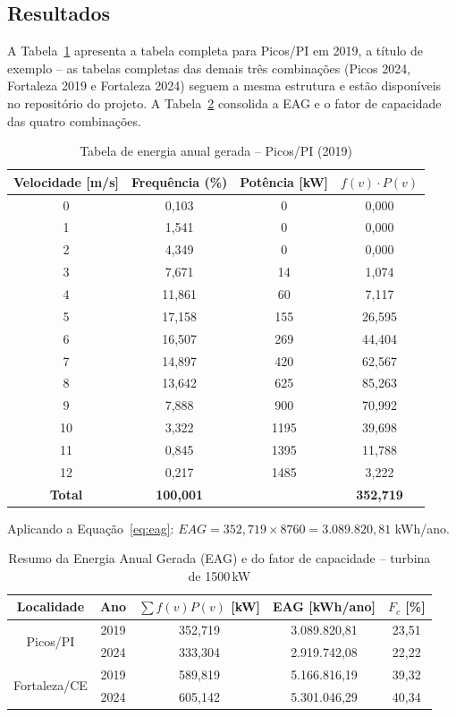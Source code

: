 \documentclass[11pt,a4paper]{article}
\begin{document}
\subsection{Resultados}

A Tabela~\ref{tab:eag_picos_2019} apresenta a tabela completa para
Picos/PI em 2019, a título de exemplo -- as tabelas completas das
demais três combinações (Picos 2024, Fortaleza 2019 e Fortaleza 2024)
seguem a mesma estrutura e estão disponíveis no repositório do projeto.
A Tabela~\ref{tab:resumo_eag} consolida a EAG e o fator de capacidade
das quatro combinações.

\begin{table}[H]
\centering
\caption{Tabela de energia anual gerada -- Picos/PI (2019)}
\label{tab:eag_picos_2019}
\begin{tabular}{cccc}
\toprule
\textbf{Velocidade [m/s]} & \textbf{Frequência (\%)} & \textbf{Potência [kW]} & \textbf{$f(v)\cdot P(v)$} \\
\midrule
0  & 0,103  & 0    & 0,000 \\
1  & 1,541  & 0    & 0,000 \\
2  & 4,349  & 0    & 0,000 \\
3  & 7,671  & 14   & 1,074 \\
4  & 11,861 & 60   & 7,117 \\
5  & 17,158 & 155  & 26,595 \\
6  & 16,507 & 269  & 44,404 \\
7  & 14,897 & 420  & 62,567 \\
8  & 13,642 & 625  & 85,263 \\
9  & 7,888  & 900  & 70,992 \\
10 & 3,322  & 1195 & 39,698 \\
11 & 0,845  & 1395 & 11,788 \\
12 & 0,217  & 1485 & 3,222 \\
\midrule
\textbf{Total} & \textbf{100,001} & & \textbf{352,719} \\
\bottomrule
\end{tabular}
\end{table}

\noindent Aplicando a Equação~\eqref{eq:eag}: $EAG = 352{,}719 \times 8760 = 3.089.820{,}81$ kWh/ano.

\begin{table}[H]
\centering
\caption{Resumo da Energia Anual Gerada (EAG) e do fator de capacidade -- turbina de 1500\,kW}
\label{tab:resumo_eag}
\begin{tabular}{ccccc}
\toprule
\textbf{Localidade} & \textbf{Ano} & $\sum f(v)P(v)$ \textbf{[kW]} & \textbf{EAG [kWh/ano]} & $F_c$ \textbf{[\%]} \\
\midrule
\multirow{2}{*}{Picos/PI}     & 2019 & 352,719 & 3.089.820,81 & 23,51 \\
                               & 2024 & 333,304 & 2.919.742,08 & 22,22 \\
\midrule
\multirow{2}{*}{Fortaleza/CE} & 2019 & 589,819 & 5.166.816,19 & 39,32 \\
                               & 2024 & 605,142 & 5.301.046,29 & 40,34 \\
\bottomrule
\end{tabular}
\end{table}
\end{document}
